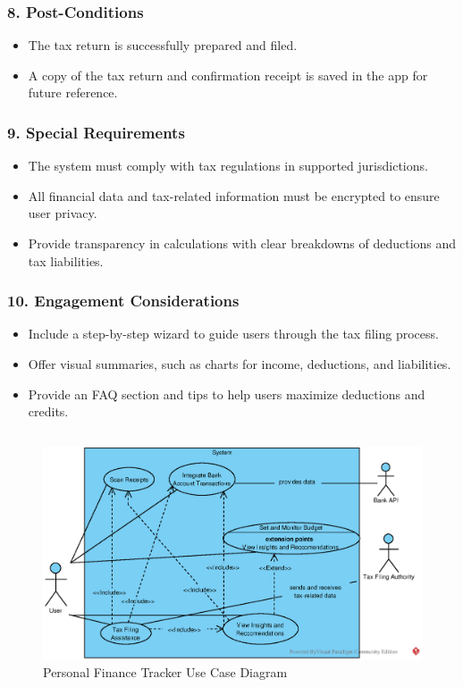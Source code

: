 \subsubsection*{8. Post-Conditions}
\begin{itemize}
    \item The tax return is successfully prepared and filed.
    \item A copy of the tax return and confirmation receipt is saved in the app for future reference.
\end{itemize}

\subsubsection*{9. Special Requirements}
\begin{itemize}
    \item The system must comply with tax regulations in supported jurisdictions.
    \item All financial data and tax-related information must be encrypted to ensure user privacy.
    \item Provide transparency in calculations with clear breakdowns of deductions and tax liabilities.
\end{itemize}

\subsubsection*{10. Engagement Considerations}
\begin{itemize}
    \item Include a step-by-step wizard to guide users through the tax filing process.
    \item Offer visual summaries, such as charts for income, deductions, and liabilities.
    \item Provide an FAQ section and tips to help users maximize deductions and credits.
\end{itemize}

\newpage



\subsection{}
\begin{figure}[!h]
    \centering
    \includegraphics[width=0.7\linewidth]{eps/PFPUseCaseDiagram.eps}
    \caption{Personal Finance Tracker Use Case Diagram}
    \label{fig:PFP-usecase}
\end{figure}

